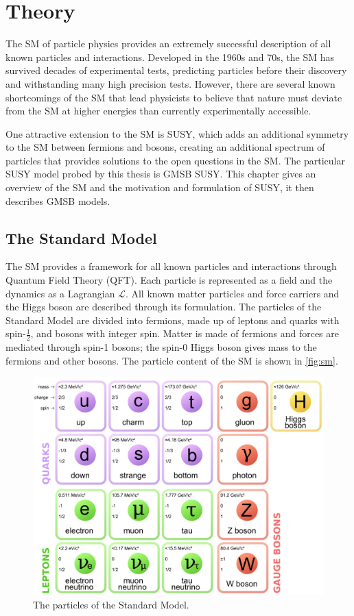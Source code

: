 \chapter{Theory}
\label{chap:theory}

The \acf{SM} of particle physics provides an extremely successful description of all known particles and interactions. Developed in the 1960s and 70s, the \ac{SM} has survived decades of experimental tests, predicting particles before their discovery and withstanding many high precision tests. However, there are several known shortcomings of the \ac{SM} that lead physicists to believe that nature must deviate from the \ac{SM} at higher energies than currently experimentally accessible. 

One attractive extension to the \acf{SM} is \acf{SUSY}, which adds an additional symmetry to the \ac{SM} between fermions and bosons, creating an additional spectrum of particles that provides solutions to the open questions in the \ac{SM}. The particular \ac{SUSY} model probed by this thesis is \acf{GMSB} \ac{SUSY}. This chapter gives an overview of the \ac{SM} and the motivation and formulation of \ac{SUSY}, it then describes \ac{GMSB} models. 


\section{The Standard Model}

The \acf{SM} provides a framework for all known particles and interactions through Quantum Field Theory (QFT). Each particle is represented as a field and the dynamics as a Lagrangian $\mathcal{L}$. All known matter particles and force carriers and the Higgs boson are described through its formulation. The particles of the Standard Model are divided into fermions, made up of leptons and quarks with spin-$\frac{1}{2}$, and bosons with integer spin. Matter is made of fermions and forces are mediated through spin-1 bosons; the spin-0 Higgs boson gives mass to the fermions and other bosons. The particle content of the \ac{SM} is shown in \autoref{fig:sm}. 
 
\begin{figure}[htbp]
\centering
\includegraphics[width=.8\textwidth]{figures/theory/standard-model.jpg}
\caption{The particles of the Standard Model. \cite{standard-model-cartoon}}
\label{fig:sm}
\end{figure}



